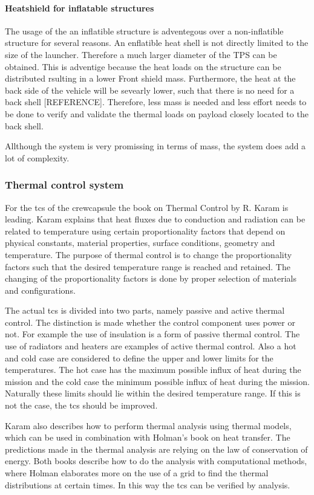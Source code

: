 \paragraph{Heatshield for inflatable structures}
The usage of the an inflatible structure is adventegous over a non-inflatible structure for several reasons. An enflatible heat shell is not directly limited to the size of the launcher. Therefore a much larger diameter of the TPS can be obtained. This is adventige because the heat loads on the structure can be distributed rsulting in a lower Front shield mass. Furthermore, the heat at the back side of the vehicle will be sevearly lower, such that there is no need for a back shell [REFERENCE]. Therefore, less mass is needed and less effort needs to be done to verify and validate the thermal loads on payload closely located to the back shell.

Allthough the system is very promissing in terms of mass, the system does add a lot of complexity.


\subsubsection{Thermal control system}
For the \gls{tcs} of the crewcapsule the book on Thermal Control by R. Karam is leading. \cite{Karam1998} Karam explains that heat fluxes due to conduction and radiation can be related to temperature using certain proportionality factors that depend on physical constants, material properties, surface conditions, geometry and temperature. The purpose of thermal control is to change the proportionality factors such that the desired temperature range is reached and retained. The changing of the proportionality factors is done by proper selection of materials and configurations.

The actual \gls{tcs} is divided into two parts, namely passive and active thermal control. The distinction is made whether the control component uses power or not. For example the use of insulation is a form of passive thermal control. The use of radiators and heaters are examples of active thermal control. Also a hot and cold case are considered to define the upper and lower limits for the temperatures. The hot case has the maximum possible influx of heat during the mission and the cold case the minimum possible influx of heat during the mission. Naturally these limits should lie within the desired temperature range. If this is not the case, the \gls{tcs} should be improved.

Karam also describes how to perform thermal analysis using thermal models, which can be used in combination with Holman's book on heat transfer. \cite{Holman2002} The predictions made in the thermal analysis are relying on the law of conservation of energy. Both books describe how to do the analysis with computational methods, where Holman elaborates more on the use of a grid to find the thermal distributions at certain times. In this way the \gls{tcs} can be verified by analysis.




